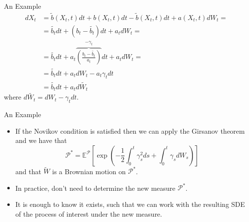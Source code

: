 \documentclass{beamer}
\begin{document}
\begin{frame}{An Example}
  \begin{equation*}
    \begin{aligned}
      dX_t &= \tilde{b}(X_t,t) dt+b(X_t,t) dt -\tilde{b}(X_t,t) dt + a(X_t,t) dW_t = \\
      &=\tilde{b_t} dt + (b_t -\tilde{b_t})dt + a_t dW_t =\\
      &=\tilde{b_t}dt+ a_t\overbrace{\left(\frac{b_t-\tilde{b_t}}{a_t}\right)}^{-\gamma_t}dt + a_t dW_t = \\
      &= \tilde{b_t}dt+a_t dW_t - a_t\gamma_t dt\\
      &=\tilde{b_t}dt+a_t d\tilde{W_t}
    \end{aligned}
  \end{equation*}
  where $d\tilde{W_t}=dW_t-\gamma_t dt$.
\end{frame}

\begin{frame}{An Example}
  \begin{itemize}
  \item<1-> If the Novikov condition is satisfied then we can apply the Girsanov theorem and we have that
    \begin{equation}
      \mathcal{P}^* = \mathbb{E}^\mathcal{P}\left[\exp\left(-\frac{1}{2}\int_0^t \gamma_s^2 ds + \int_0^t \gamma_s dW_s \right)\right]
    \end{equation}
    and that $\tilde{W}$ is a Brownian motion on $\mathcal{P}^*$.
  \item<2-> In practice, don't need to determine the new measure $\mathcal{P}^*$.
  \item<3-> It is enough to know it exists, such that we can work with the resulting SDE of the process of interest under the new measure.	
  \end{itemize}
\end{frame}
\end{document}
